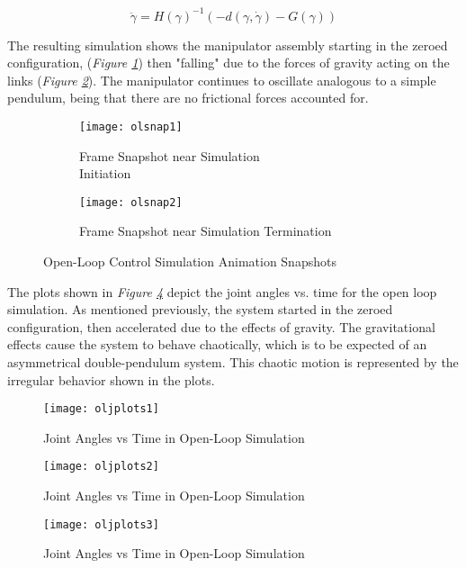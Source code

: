 \begin{equation}
\ddot{\gamma}=H(\gamma)^{-1}(-d(\gamma, \dot{\gamma})-G(\gamma))
\label{eq:eoms2}
\end{equation}

The resulting simulation shows the manipulator assembly starting in the zeroed configuration, (\emph{Figure \ref{fig:olsnap1}}) then "falling" due to the forces of gravity acting on the links (\emph{Figure \ref{fig:olsnap2}}). The manipulator continues to oscillate analogous to a simple pendulum, being that there are no frictional forces accounted for.

\begin{figure}[htp]
  \center
  \begin{subfigure}[c]{0.5\textwidth}
  \center
  \texttt{[image: olsnap1]}
  \caption{Frame Snapshot near Simulation \\Initiation}
  \label{fig:olsnap1}
\end{subfigure}%
\begin{subfigure}[c]{0.5\textwidth}
  \center
  \texttt{[image: olsnap2]}
  \caption{Frame Snapshot near Simulation Termination}
  \label{fig:olsnap2}
\end{subfigure}
  \caption{Open-Loop Control Simulation Animation Snapshots}
  \label{fig:olsnaps}
\end{figure}

The plots shown in \emph{Figure \ref{fig:oljplots1}} depict the joint angles vs. time for the open loop simulation. As mentioned previously, the system started in the zeroed configuration, then accelerated due to the effects of gravity. The gravitational effects cause the system to behave chaotically, which is to be expected of an asymmetrical double-pendulum system. This chaotic motion is represented by the irregular behavior shown in the plots.

\begin{figure}[htp]
  \center
  \texttt{[image: oljplots1]}
  \caption{Joint Angles vs Time in Open-Loop Simulation}
  \label{fig:oljplots1}
\end{figure}
\begin{figure}[htp]
  \center
  \ContinuedFloat
  \captionsetup{list=off,format=cont}
  \texttt{[image: oljplots2]}
  \caption{Joint Angles vs Time in Open-Loop Simulation}
  \label{fig:oljplots2}
\end{figure}
\begin{figure}[htp]
  \center
  \ContinuedFloat
  \captionsetup{list=off,format=cont}
  \texttt{[image: oljplots3]}
  \caption{Joint Angles vs Time in Open-Loop Simulation}
  \label{fig:oljplots3}
\end{figure}

